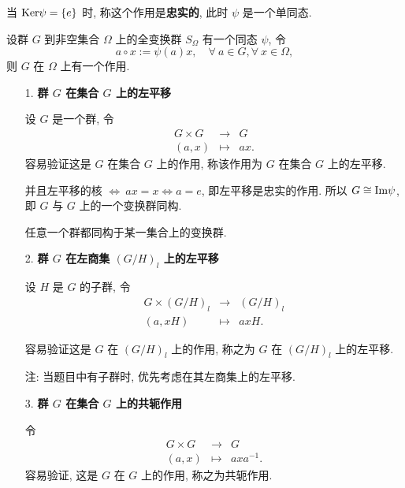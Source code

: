 \begin{definition}\label{忠实的作用}
	当 $\text {Ker}\psi=\{e\}$ 时, 称这个作用是\textbf{忠实的}, 此时 $\psi$ 是一个单同态.
\end{definition}

\begin{proposition}
	设群 $G$ 到非空集合 $\Omega$ 上的全变换群 $S_\Omega$ 有一个同态 $\psi$, 令 $$a\circ x:=\psi(a)x,\quad \forall\ a\in G,\forall\ x \in \Omega,$$ 则 $G$ 在 $\Omega$ 上有一个作用.
\end{proposition}

\begin{itemize}[leftmargin=1cm]
	\item[1.] \textbf{群 $G$ 在集合 $G$ 上的左平移}

	设 $G$ 是一个群, 令
	$$
	\begin{array}{rcl}
		G\times G & \to & G \\
		(a,x) & \mapsto & ax.
	\end{array}
	$$
	容易验证这是 $G$ 在集合 $G$ 上的作用, 称该作用为 $G$ 在集合 $G$ 上的左平移.

	并且左平移的核 $\Leftrightarrow\ ax=x\Leftrightarrow a=e$, 即左平移是忠实的作用. 所以 $G\cong \text {Im}\psi$, 即 $G$ 与 $G$ 上的一个变换群同构.

	\begin{theorem}[Cayley]
		任意一个群都同构于某一集合上的变换群.
	\end{theorem}

	\item[2.] \textbf{群 $G$ 在左商集 $(G/H)_l$ 上的左平移}

	设 $H$ 是 $G$ 的子群, 令
	$$
	\begin{array}{rcl}
		G\times(G/H)_l & \to & (G/H)_l \\
		(a,xH) & \mapsto & axH.
	\end{array}
	$$

	容易验证这是 $G$ 在 $(G/H)_l$ 上的作用, 称之为 $G$ 在 $(G/H)_l$ 上的左平移.

	注: 当题目中有子群时, 优先考虑在其左商集上的左平移.

	\item[3.] \textbf{群 $G$ 在集合 $G$ 上的共轭作用}

	令 $$
	\begin{array}{rcl}
		G\times G & \to & G \\
		(a,x) & \mapsto & axa^{-1}.
	\end{array}
	$$
	容易验证, 这是 $G$ 在 $G$ 上的作用, 称之为共轭作用.

\end{itemize}

